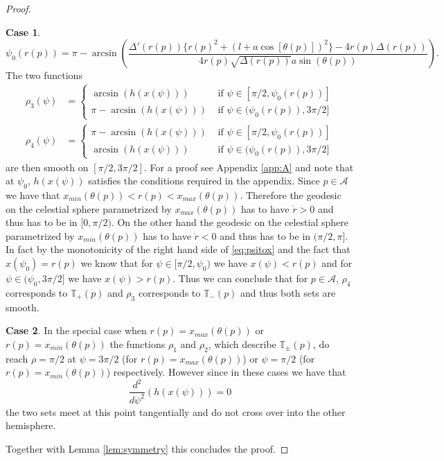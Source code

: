 \documentclass[reqno]{amsart}
\numberwithin{equation}{section}
\theoremstyle{plain}
\theoremstyle{definition}
\newtheorem{case}{Case}
\begin{document}
\begin{proof}
\begin{case}
\begin{equation}
    \psi_0(r(p))= \pi-\arcsin\left(\frac{\Delta'(r(p))\{r(p)^2 +(l+a \cos [\theta(p)])^2\}-4 r(p) \Delta(r(p))}{4r(p)\sqrt{\Delta(r(p))}a\sin(\theta(p))}\right).
\end{equation}
The two functions
\begin{align}
\rho_3(\psi)&=\begin{cases}
\arcsin(h(x(\psi))) &\text{ if } \psi\in[\pi/2,\psi_0(r(p))]\\
\pi-\arcsin(h(x(\psi)))&\text{ if } \psi\in (\psi_0(r(p)),3\pi/2]
\end{cases}\\
\rho_4(\psi)&=\begin{cases}
\pi-\arcsin(h(x(\psi))) &\text{ if } \psi\in[\pi/2,\psi_0(r(p))]\\
\arcsin(h(x(\psi)))&\text{ if } \psi\in (\psi_0(r(p)),3\pi/2]
\end{cases}
\end{align}
are then smooth on $[\pi/2,3\pi/2]$. For a proof see Appendix \ref{app:A} and note that at $\psi_0$, $h(x(\psi))$ satisfies the conditions required in the appendix. Since $p\in \mathcal{A}$ we have that $x_{min}(\theta(p))<r(p)<x_{max}(\theta(p))$. Therefore the geodesic on the celestial sphere parametrized by $x_{max}(\theta(p))$ has to have $\dot r>0$ and thus has to be in $[0,\pi/2)$.  On the other hand the geodesic on the celestial sphere parametrized by $x_{min}(\theta(p))$ has to have $\dot r<0$ and thus has to be in $(\pi/2,\pi]$. In fact by the monotonicity of the right hand side of \eqref{eq:psitox} and the fact that $x(\psi_0)=r(p)$ we know that for $\psi \in [\pi/2,\psi_0)$ we have $x(\psi)<r(p)$ and for $\psi \in (\psi_0,3\pi/2]$ we have $x(\psi)>r(p)$. Thus we can conclude that for $p\in \mathcal{A}$, $\rho_4$ corresponds to $\mathbb{T}_+(p) $ and $\rho_3$ corresponds to $ \mathbb{T}_-(p)$ and thus both sets are smooth.\end{case}
\begin{case}In the special case when $r(p)= x_{max}(\theta(p))$ or $r(p)= x_{min}(\theta(p))$ the functions $\rho_1$ and $\rho_2$,  which describe $\mathbb{T}_\pm(p)$, do reach $\rho=\pi/2$ at $\psi=3\pi/2$ (for $r(p)= x_{max}(\theta(p))$) or $\psi=\pi/2$ (for $r(p)= x_{min}(\theta(p))$) respectively. However since in these cases we have that
\begin{equation}
    \frac{d^2}{d\psi^2}(h(x(\psi)))=0 
\end{equation}
the two sets meet at this point tangentially and do not cross over into the other hemisphere.\end{case}
Together with Lemma \ref{lem:symmetry} this concludes the proof. 
\end{proof}
\end{document}
